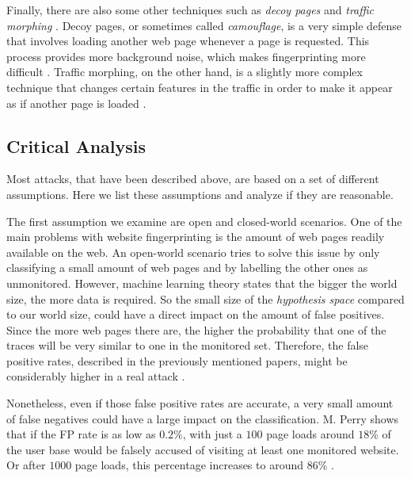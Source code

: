 Finally, there are also some other techniques such as \textit{decoy pages} and \textit{traffic morphing} \cite{wright2009traffic,panchenko1}.
Decoy pages, or sometimes called \textit{camouflage}, is a very simple defense that involves loading another web page whenever a page is requested.
This process provides more background noise, which makes fingerprinting more difficult \cite{panchenko1}.
Traffic morphing, on the other hand, is a slightly more complex technique that changes certain features in the traffic in order to make it appear as if another page is loaded \cite{wright2009traffic}.

\subsection{Critical Analysis}

Most attacks, that have been described above, are based on a set of different assumptions.
Here we list these assumptions and analyze if they are reasonable.

The first assumption we examine are open and closed-world scenarios.
One of the main problems with website fingerprinting is the amount of web pages readily available on the web.
An open-world scenario tries to solve this issue by only classifying a small amount of web pages and by labelling the other ones as unmonitored.
However, machine learning theory states that the bigger the world size, the more data is required.
So the small size of the \textit{hypothesis space} compared to our world size, could have a direct impact on the amount of false positives.
Since the more web pages there are, the higher the probability that one of the traces will be very similar to one in the monitored set.
Therefore, the false positive rates, described in the previously mentioned papers, might be considerably higher in a real attack \cite{wfpcritique}.

\newpage

Nonetheless, even if those false positive rates are accurate, a very small amount of false negatives could have a large impact on the classification.
M. Perry shows that if the FP rate is as low as $0.2\%$, with just a $100$ page loads around $18\%$ of the user base would be falsely accused of visiting at least one monitored website.
Or after $1000$ page loads, this percentage increases to around $86\%$ \cite{wfpcritique}.

